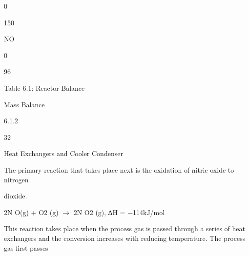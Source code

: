 \documentclass[a4paper,portrait,12pt]{article}
\begin{document}
0





150





\begin{flushleft}
NO
\end{flushleft}





0





96





\begin{flushleft}
Table 6.1: Reactor Balance
\end{flushleft}





\begin{flushleft}
\newpage
Mass Balance
\end{flushleft}





6.1.2





32





\begin{flushleft}
Heat Exchangers and Cooler Condenser
\end{flushleft}





\begin{flushleft}
The primary reaction that takes place next is the oxidation of nitric oxide to nitrogen
\end{flushleft}


\begin{flushleft}
dioxide.
\end{flushleft}


\begin{flushleft}
2N O(g) + O2 (g) $\rightarrow$ 2N O2 (g), ∆H = $-$114kJ/mol
\end{flushleft}


\begin{flushleft}
This reaction takes place when the process gas is passed through a series of heat exchangers and the conversion increases with reducing temperature. The process gas first passes
\end{flushleft}
\end{document}
